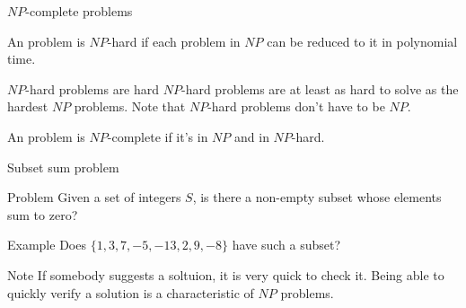 \begin{frame}{$NP$-complete problems}
  \begin{definition}
    An problem is $NP$-hard if each problem in $NP$ can be reduced to it in polynomial time.
  \end{definition}
  
  \vspace{0.5cm}
  {
  \begin{block}{$NP$-hard problems are hard}
  $NP$-hard problems are at least as hard to solve as the hardest $NP$ problems.
  Note that $NP$-hard problems don't have to be $NP$.
  \end{block}}
  
  \vspace{0.5cm}
  \begin{definition}
    An problem is $NP$-complete if it's in $NP$ and in $NP$-hard.
  \end{definition}
\end{frame}

\begin{frame}{Subset sum problem}
   
   {
  \begin{block}{Problem}
    Given a set of integers $S$, is there a non-empty subset whose elements sum to zero?
  \end{block}}

  \vspace{0.5cm}
  
  \begin{block}{Example}
    Does $\{ 1, 3, 7, -5, -13, 2, 9, -8 \}$ have such a subset?
  \end{block}
  
  \vspace{0.5cm}

  \begin{block}{Note}
     If somebody suggests a soltuion, it is very quick to check it.
    Being able to quickly verify a solution is a characteristic of $NP$ problems.
  \end{block}
\end{frame}

